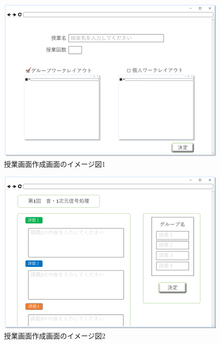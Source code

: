 \begin{figure}[htbp]
\begin{center}
  \includegraphics[width=1\linewidth,clip]{./img/sc_class_creat1.png}
  \caption{授業画面作成画面のイメージ図1}\label{fig:sc_class_creat1}
\end{center}
\end{figure}

\begin{figure}[htbp]
\begin{center}
  \includegraphics[width=1\linewidth,clip]{./img/sc_class_creat2.png}
  \caption{授業画面作成画面のイメージ図2}\label{fig:sc_class_creat2}
\end{center}
\end{figure}
